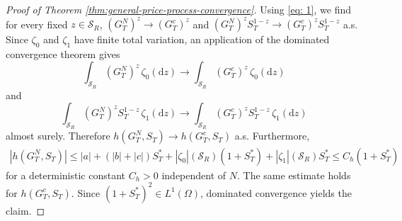 \documentclass[10pt,a4paper,reqno]{amsart}
\theoremstyle{plain}
\theoremstyle{definition}
\theoremstyle{remark}
\theoremstyle{example}
\begin{document}
\begin{proof}[Proof of Theorem \ref{thm:general-price-process-convergence}]
    Using \eqref{eq: 1}, we find for every fixed $z\in\mathcal S_R$, $(G_T^N)^z \longrightarrow (G_T^c)^z$ and $(G_T^N)^zS_T^{1-z} \longrightarrow (G_T^c)^zS_T^{1-z}$ a.s. Since $\zeta_0$ and $\zeta_1$ have finite total variation, an application of the dominated convergence theorem gives 
    \[
        \int_{\mathcal S_R} (G_T^N)^z\,\zeta_0(\mathrm dz) \longrightarrow \int_{\mathcal S_R} (G_T^c)^z\,\zeta_0(\mathrm dz)
    \]
    and
    \[
        \int_{\mathcal S_R} (G_T^N)^zS_T^{1-z}\,\zeta_1(\mathrm dz) \longrightarrow \int_{\mathcal S_R}(G_T^c)^zS_T^{1-z}\,\zeta_1(\mathrm dz)
    \]
    almost surely. Therefore $h(G_T^N,S_T) \longrightarrow h(G_T^c,S_T)$ a.s. Furthermore,
    \begin{align*}
        |h(G_T^N,S_T)| \leq |a| + (|b|+|c|)S_T^* + |\zeta_0|(\mathcal S_R)(1+S_T^*) + |\zeta_1|(\mathcal S_R)S_T^* \leq C_h(1+S_T^*)
    \end{align*}
    for a deterministic constant $C_h>0$ independent of $N$. The same estimate holds for $h(G_T^c,S_T)$. Since $(1+S_T^*)^2\in L^1(\Omega)$, dominated convergence yields the claim. 
\end{proof}
\end{document}
